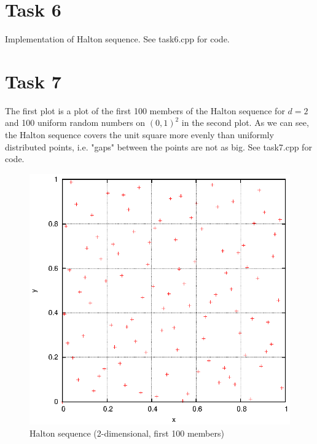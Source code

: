 \documentclass[]{article}
\begin{document}
\section*{Task 6}
Implementation of Halton sequence. See task6.cpp for code.
\clearpage

\section*{Task 7} The first plot is a plot of the
first 100 members of the Halton sequence for $d=2$ and 100 uniform random numbers on
$(0,1)^2$ in the second plot. As we can see, the Halton sequence covers the
unit square more evenly than uniformly distributed points, i.e. "gaps" between the points are not as
big. See task7.cpp for code. \\
\begin{figure}[!ht]
\centering
\includegraphics[width=.9\textwidth]{task7_halton.eps}
\caption{Halton sequence (2-dimensional, first 100 members)}
\label{fig:Task7a}
\end{figure}
\end{document}
